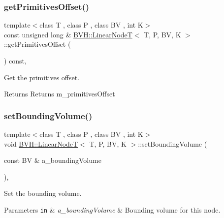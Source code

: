 \subsubsection{\texorpdfstring{get\+Primitives\+Offset()}{getPrimitivesOffset()}}
{\footnotesize\ttfamily template$<$class T , class P , class BV , int K$>$ \\
const unsigned long \& \hyperlink{classBVH_1_1LinearNodeT}{B\+V\+H\+::\+Linear\+NodeT}$<$ T, P, BV, K $>$\+::get\+Primitives\+Offset (\begin{DoxyParamCaption}{ }\end{DoxyParamCaption}) const\hspace{0.3cm}{\ttfamily [inline]}, {\ttfamily [noexcept]}}



Get the primitives offset. 

\begin{DoxyReturn}{Returns}
Returns m\+\_\+primitives\+Offset 
\end{DoxyReturn}
\mbox{\label{classBVH_1_1LinearNodeT_a03e3dd1c74bf9e66ed692130b49c2e0f}} 
\subsubsection{\texorpdfstring{set\+Bounding\+Volume()}{setBoundingVolume()}}
{\footnotesize\ttfamily template$<$class T , class P , class BV , int K$>$ \\
void \hyperlink{classBVH_1_1LinearNodeT}{B\+V\+H\+::\+Linear\+NodeT}$<$ T, P, BV, K $>$\+::set\+Bounding\+Volume (\begin{DoxyParamCaption}\item[{const BV \&}]{a\+\_\+bounding\+Volume }\end{DoxyParamCaption})\hspace{0.3cm}{\ttfamily [inline]}, {\ttfamily [noexcept]}}



Set the bounding volume. 


\begin{DoxyParams}[1]{Parameters}
\mbox{\tt in}  & {\em a\+\_\+bounding\+Volume} & Bounding volume for this node. \\
\hline
\end{DoxyParams}
\mbox{\label{classBVH_1_1LinearNodeT_a3a972ef5ea9abc6e2ead9f453e233e2f}} 
